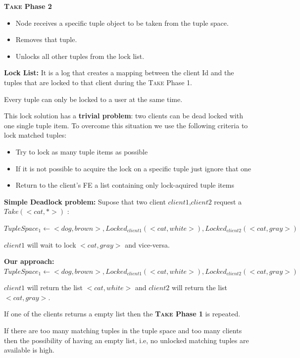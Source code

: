 \documentclass[times, 10pt,twocolumn]{article}
\begin{document}
\textbf{\textsc{Take} Phase 2}
\begin{itemize}
   \item Node receives a specific tuple object to be taken from the tuple space.
   \item Removes that tuple.
   \item Unlocks all other tuples from the lock list.
\end{itemize}

\textbf{Lock List:} It is a log that creates a mapping between the client Id and the
tuples that are locked to that client during the \textsc{Take} Phase 1.

Every tuple can only be locked to a user at the same time.

This lock solution has a \textbf{trivial problem}: two clients can be dead locked with one
single tuple item. To overcome this situation we use the following criteria to lock matched tuples:
\begin{itemize}
   \item Try to lock as many tuple items as possible
   \item If it is not possible to acquire the lock on a specific tuple just ignore that one
   \item Return to the client's FE a list containing only lock-aquired tuple items
\end{itemize}

\textbf{Simple Deadlock problem:}
Supose that two client $client1$,$client2$ request a $ Take(<cat, *>) $ :

$ TupleSpace_{1} \leftarrow <dog, brown>, Locked_{client1}(<cat, white>), Locked_{client2}(<cat, gray>) $

$client1$ will wait to lock $<cat, gray>$ and vice-versa.

\textbf{Our approach:}
$ TupleSpace_{1} \leftarrow <dog, brown>, Locked_{client1}(<cat, white>), Locked_{client2}(<cat, gray>) $

$client1$ will return the list $<cat, white>$ and $client2$ will return the list $<cat, gray>$.

If one of the clients returns a empty list then the \textbf{\textsc{Take} Phase 1} is repeated.

If there are too many matching tuples in the tuple space and too many clients then the possibility
of having an empty list, i.e, no unlocked matching tuples are available is high.
\end{document}
